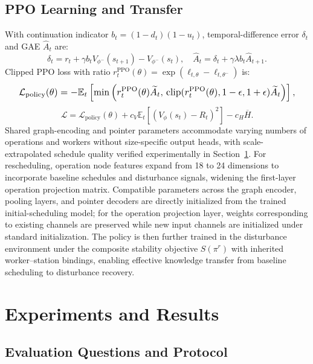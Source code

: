 \documentclass[journal,10pt]{IEEEtran}
\begin{document}
\subsection{PPO Learning and Transfer}

With continuation indicator $b_t=(1-d_t)(1-u_t)$, temporal-difference error $\delta_t$ and GAE $\widehat A_t$ are:
\begin{equation}
\delta_t = r_t + \gamma b_t V_{\phi^-}(s_{t+1}) - V_{\phi^-}(s_t), \quad \widehat A_t = \delta_t + \gamma\lambda b_t \widehat A_{t+1}.
\end{equation}
Clipped PPO loss with ratio $r_t^{\mathrm{PPO}}(\theta)=\exp(\ell_{t,\theta}-\ell_{t,\theta^-})$ is:
\begin{equation}
\resizebox{0.95\linewidth}{!}{$\displaystyle
\mathcal L_{\mathrm{policy}}(\theta) = -\mathbb E_t\left[\min\left(r_t^{\mathrm{PPO}}(\theta)\widetilde A_t,\, \operatorname{clip}(r_t^{\mathrm{PPO}}(\theta), 1-\epsilon, 1+\epsilon)\widetilde A_t\right)\right],
$}
\end{equation}
\begin{equation}
\mathcal L = \mathcal L_{\mathrm{policy}}(\theta) + c_V \mathbb E_t[(V_\phi(s_t)-R_t)^2] - c_H \overline H.
\end{equation}
Shared graph-encoding and pointer parameters accommodate varying numbers of operations and workers without size-specific output heads, with scale-extrapolated schedule quality verified experimentally in Section~\ref{sec:experiments}. For rescheduling, operation node features expand from 18 to 24 dimensions to incorporate baseline schedules and disturbance signals, widening the first-layer operation projection matrix. Compatible parameters across the graph encoder, pooling layers, and pointer decoders are directly initialized from the trained initial-scheduling model; for the operation projection layer, weights corresponding to existing channels are preserved while new input channels are initialized under standard initialization. The policy is then further trained in the disturbance environment under the composite stability objective $S(\pi^r)$ with inherited worker--station bindings, enabling effective knowledge transfer from baseline scheduling to disturbance recovery.

\section{Experiments and Results}\label{sec:experiments}

\subsection{Evaluation Questions and Protocol}
\end{document}
